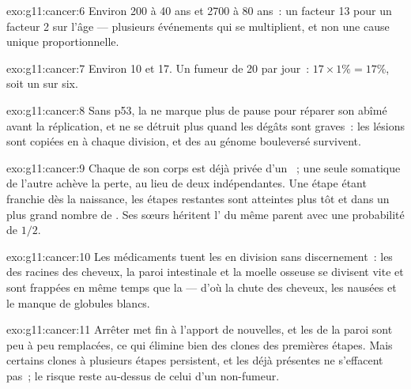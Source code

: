 \begin{solution}{exo:g11:cancer:6}
Environ 200 à 40 ans et 2700 à 80 ans~: un facteur 13 pour un facteur 2
sur l'âge --- plusieurs événements qui se multiplient, et non une cause
unique proportionnelle.
\end{solution}

\begin{solution}{exo:g11:cancer:7}
Environ 10 et 17. Un fumeur de 20 par jour~: $17 \times 1\% = 17\%$,
soit un sur six.
\end{solution}

\begin{solution}{exo:g11:cancer:8}
Sans p53, la  ne marque plus de pause pour réparer son  abîmé
avant la réplication, et ne se détruit plus quand les dégâts sont
graves~: les lésions sont copiées en  à chaque division, et
des  au génome bouleversé survivent.
\end{solution}

\begin{solution}{exo:g11:cancer:9}
Chaque  de son corps est déjà privée d'un ~; une seule
 somatique de l'autre achève la perte, au lieu de deux
 indépendantes. Une étape étant franchie dès la naissance, les
étapes restantes sont atteintes plus tôt et dans un plus grand nombre
de . Ses sœurs héritent l' du même parent avec une
probabilité de $1/2$.
\end{solution}

\begin{solution}{exo:g11:cancer:10}
Les médicaments tuent les  en division sans discernement~: les
 des racines des cheveux, la paroi intestinale et la moelle
osseuse se divisent vite et sont frappées en même temps que la 
--- d'où la chute des cheveux, les nausées et le manque de globules
blancs.
\end{solution}

\begin{solution}{exo:g11:cancer:11}
Arrêter met fin à l'apport de  nouvelles, et les  de
la paroi sont peu à peu remplacées, ce qui élimine bien des clones
 des premières étapes. Mais certains clones à plusieurs étapes
persistent, et les  déjà présentes ne s'effacent pas~; le
risque reste au-dessus de celui d'un non-fumeur.
\end{solution}

